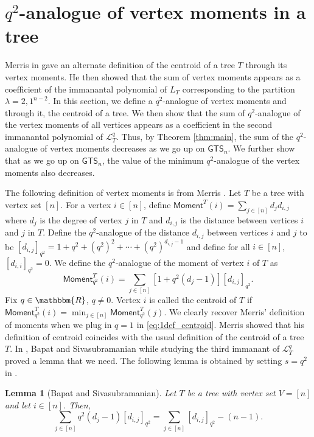 \documentclass[12pt]{article}
\newtheorem{lemma}[theorem]{Lemma}
\newcommand{\sL}{  \mathcal{ L}}
\newcommand{\ssM}{  \mathsf{Moment}}
\newcommand{\RR}{ \mathbbm{R}}
\newcommand{\GTS}{\mathsf{GTS}}
\begin{document}
\section{$q^2$-analogue of vertex moments in a tree}
\label{sec:centroid}
Merris in \cite{merris-second-imm-polynom}
gave an alternate definition of the centroid of a tree $T$ 
through its vertex moments.  He then  showed that
the sum of vertex moments appears as a coefficient 
of the immanantal polynomial of $L_T$ corresponding to
the partition $\lambda = 2,1^{n-2}$.
In this section, we define a $q^2$-analogue of vertex moments and 
through it, 
the centroid of a tree.   We then show that the sum of $q^2$-analogue
of the vertex moments of all vertices appears as a coefficient 
in the second immanantal polynomial of $\sL_T^q$.  
Thus, by Theorem \ref{thm:main},
the sum of the $q^2$-analogue of vertex 
moments decreases as we go up on $\GTS_n$.  
We further show that as we go up on $\GTS_n$,  
the value of the minimum $q^2$-analogue of the vertex moments also 
decreases. 

The following definition of vertex moments is from Merris 
\cite{merris-second-imm-polynom}.
Let $T$ be a tree with vertex set $[n]$.  For a vertex $i \in [n]$,
define 
$\ssM^T(i) = \sum_{j \in [n]} d_j d_{i,j}$ where $d_j$ is 
the degree of vertex $j$ in $T$ and $d_{i,j}$ is the distance
between vertices $i$ and $j$ in $T$.   Define 
the $q^2$-analogue of the distance $d_{i,j}$ between vertices
$i$ and $j$ to be 
$[d_{i,j}]_{q^2} =1+q^2+(q^2)^2+\cdots+(q^2)^{d_{i,j}^{ }-1}$ 
and define for all $i \in [n]$, $[d_{i,i}]_{q^2} = 0$.
We define the $q^2$-analogue of the moment of vertex $i$ 
of $T$ as
\begin{equation}
\label{eq:1def_centroid}
\ssM_{q^2}^T(i)=\sum\limits_{j\in [n]} [1+q^2(d_j-1)] [d_{i,j}]_{q^2}.
\end{equation}
Fix $q\in \RR$, $q \not= 0$.  Vertex $i$ is called the centroid 
of $T$  if $\ssM_{q^2}^T(i)=\min_{j\in [n]} \ssM_{q^2}^T(j)$.  
We clearly recover Merris' definition of moments when we plug in $q=1$ in 
\eqref{eq:1def_centroid}.
Merris showed that his definition of centroid coincides with 
the usual definition of the centroid of a tree $T$.
In \cite{bapat-siva-third-immanant},
Bapat and Sivasubramanian while studying the third immanant of $\sL_T^q$ 
proved a lemma that we need.  The following lemma is obtained 
by setting $s = q^2$ in \cite[Lemma 3]{bapat-siva-third-immanant}.


\begin{lemma}[Bapat and Sivasubramanian]
  \label{lem:frm_third_imm}
Let $T$ be a tree with vertex set $V = [n]$ and let $i \in [n]$.  Then,  
\begin{equation}
  \label{eqn:third_imm}
\sum_{j \in [n]} q^2(d_j -1) [d_{i,j}]_{q^2} = 
\sum_{j \in [n]}[d_{i,j}]_{q^2} - (n-1).
\end{equation}
\end{lemma}
\end{document}
